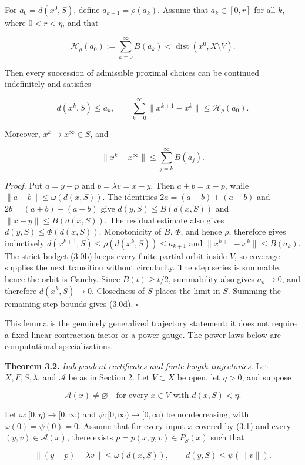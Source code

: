 \documentclass[11pt,a4paper]{article}
\theoremstyle{plain}
\theoremstyle{definition}
\theoremstyle{remark}
\begin{document}
For \(a_0=d(x^0,S)\), define \(a_{k+1}=\rho(a_k)\). Assume that
\(a_k\in[0,r]\) for all \(k\), where \(0<r<\eta\), and that

\[
\mathcal H_\rho(a_0):=\sum_{k=0}^{\infty}B(a_k)
<\operatorname{dist}(x^0,X\setminus V).
\tag{3.0b}
\]

Then every succession of admissible proximal choices can be continued
indefinitely and satisfies

\[
d(x^k,S)\le a_k,
\qquad
\sum_{k=0}^{\infty}\|x^{k+1}-x^k\|
\le \mathcal H_\rho(a_0).
\tag{3.0c}
\]

Moreover, \(x^k\to x^\infty\in S\), and

\[
\|x^k-x^\infty\|
\le \sum_{j=k}^{\infty}B(a_j).
\tag{3.0d}
\]

\emph{Proof.} Put \(a=y-p\) and \(b=\lambda v=x-y\). Then \(a+b=x-p\),
while \(\|a-b\|\le\omega(d(x,S))\). The identities \(2a=(a+b)+(a-b)\)
and \(2b=(a+b)-(a-b)\) give \(d(y,S)\le B(d(x,S))\) and
\(\|x-y\|\le B(d(x,S))\). The residual estimate also gives
\(d(y,S)\le\Phi(d(x,S))\). Monotonicity of \(B\), \(\Phi\), and hence
\(\rho\), therefore gives inductively
\(d(x^{k+1},S)\le\rho(d(x^k,S))\le a_{k+1}\) and
\(\|x^{k+1}-x^k\|\le B(a_k)\). The strict budget (3.0b) keeps every
finite partial orbit inside \(V\), so coverage supplies the next
transition without circularity. The step series is summable, hence the
orbit is Cauchy. Since \(B(t)\ge t/2\), summability also gives
\(a_k\to0\), and therefore \(d(x^k,S)\to0\). Closedness of \(S\) places
the limit in \(S\). Summing the remaining step bounds gives (3.0d).
\(\square\)

This lemma is the genuinely generalized trajectory statement: it does
not require a fixed linear contraction factor or a power gauge. The
power laws below are computational specializations.

\textbf{Theorem 3.2.} \emph{Independent certificates and finite-length
trajectories.} Let \(X,F,S,\lambda\), and \(\mathcal A\) be as in
Section 2. Let \(V\subset X\) be open, let \(\eta>0\), and suppose

\[
\mathcal A(x)\ne\varnothing
\quad\text{for every }x\in V\text{ with }d(x,S)<\eta.
\tag{3.1}
\]

Let \(\omega:[0,\eta)\to[0,\infty)\) and
\(\psi:[0,\infty)\to[0,\infty)\) be nondecreasing, with
\(\omega(0)=\psi(0)=0\). Assume that for every input \(x\) covered by
(3.1) and every \((y,v)\in\mathcal A(x)\), there exists
\(p=p(x,y,v)\in P_S(x)\) such that

\[
\|(y-p)-\lambda v\|\le\omega(d(x,S)),
\qquad
d(y,S)\le\psi(\|v\|).
\tag{3.2}
\]
\end{document}
